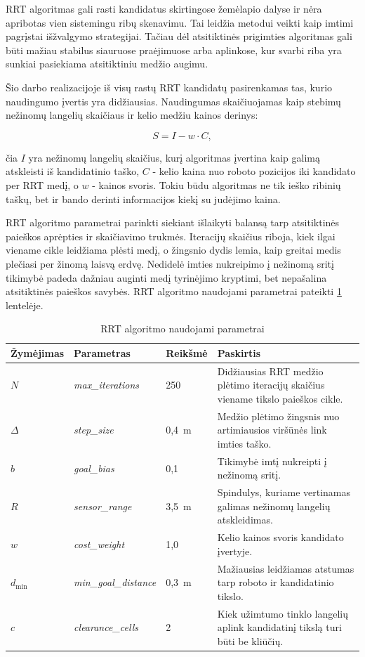 \documentclass[]{VUMIFTemplateClass}
\begin{document}
RRT algoritmas gali rasti kandidatus skirtingose žemėlapio dalyse ir nėra apribotas vien sistemingu ribų skenavimu. Tai leidžia metodui veikti kaip imtimi
pagrįstai išžvalgymo strategijai. Tačiau dėl atsitiktinės prigimties algoritmas gali būti mažiau stabilus siauruose praėjimuose arba aplinkose, kur svarbi
riba yra sunkiai pasiekiama atsitiktiniu medžio augimu.

Šio darbo realizacijoje iš visų rastų RRT kandidatų pasirenkamas tas, kurio naudingumo įvertis yra didžiausias. Naudingumas skaičiuojamas kaip stebimų
nežinomų langelių skaičiaus ir kelio medžiu kainos derinys:

\begin{equation}
S = I - w \cdot C,
\end{equation}

čia $I$ yra nežinomų langelių skaičius, kurį algoritmas įvertina kaip galimą atskleisti iš kandidatinio taško, $C$ - kelio kaina nuo roboto pozicijos iki
kandidato per RRT medį, o $w$ - kainos svoris. Tokiu būdu
algoritmas ne tik ieško ribinių taškų, bet ir bando derinti informacijos kiekį su judėjimo kaina.

RRT algoritmo parametrai parinkti siekiant išlaikyti balansą tarp atsitiktinės paieškos aprėpties ir skaičiavimo trukmės. Iteracijų skaičius riboja, kiek
ilgai viename cikle leidžiama plėsti medį, o žingsnio dydis lemia, kaip greitai medis plečiasi per žinomą laisvą erdvę. Nedidelė imties nukreipimo į nežinomą
sritį tikimybė padeda dažniau auginti medį tyrinėjimo kryptimi, bet nepašalina atsitiktinės paieškos savybės. RRT algoritmo naudojami parametrai pateikti
\ref{tab:rrt-pseudocode-params} lentelėje.

\begin{table}[H]
\centering
\caption{RRT algoritmo naudojami parametrai}
\label{tab:rrt-pseudocode-params}
\small
\begin{tabular}{|p{1.8cm}|p{3.8cm}|p{2.1cm}|p{6.2cm}|}
\hline
\textbf{Žymėjimas} & \textbf{Parametras} & \textbf{Reikšmė} & \textbf{Paskirtis} \\
\hline
$N$ & \textit{max\_iterations} & 250 & Didžiausias RRT medžio plėtimo iteracijų skaičius viename tikslo paieškos cikle. \\
\hline
$\Delta$ & \textit{step\_size} & 0,4~m & Medžio plėtimo žingsnis nuo artimiausios viršūnės link imties taško. \\
\hline
$b$ & \textit{goal\_bias} & 0,1 & Tikimybė imtį nukreipti į nežinomą sritį. \\
\hline
$R$ & \textit{sensor\_range} & 3,5~m & Spindulys, kuriame vertinamas galimas nežinomų langelių atskleidimas. \\
\hline
$w$ & \textit{cost\_weight} & 1,0 & Kelio kainos svoris kandidato įvertyje. \\
\hline
$d_{\min}$ & \textit{min\_goal\_distance} & 0,3~m & Mažiausias leidžiamas atstumas tarp roboto ir kandidatinio tikslo. \\
\hline
$c$ & \textit{clearance\_cells} & 2 & Kiek užimtumo tinklo langelių aplink kandidatinį tikslą turi būti be kliūčių. \\
\hline
\end{tabular}
\end{table}
\end{document}
